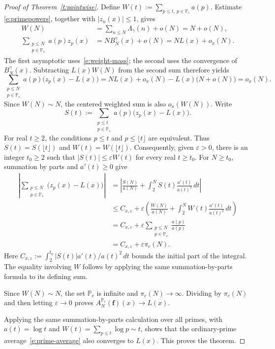 \documentclass[12pt]{amsart}
\newcommand{\1}{\mathbf 1}
\begin{document}
\begin{proof}[Proof of Theorem~\ref{t:pointwise}]
Define $W(t):=\sum_{p\leq t,\ p\in\mathbb P_c}a(p)$.
Estimate \eqref{e:primepowers}, together with $|z_n(x)|\leq1$,
gives
\begin{align*}
 W(N)
 &=\sum_{n\leq N}\Lambda_\gamma(n)+o(N)
 =N+o(N),\\
 \sum_{\substack{p\leq N\\p\in\mathbb P_c}}a(p)z_p(x)
 &=N B_N^\gamma(x)+o(N)
 =N L(x)+o_x(N).
\end{align*}
The first asymptotic uses~\eqref{e:weight-mass}; the second uses
the convergence of $B_N^\gamma(x)$. Subtracting $L(x)W(N)$
from the second sum therefore yields
\[
 \sum_{\substack{p\leq N\\p\in\mathbb P_c}}
 a(p)\bigl(z_p(x)-L(x)\bigr)
 =N L(x)+o_x(N)-L(x)\bigl(N+o(N)\bigr)
 =o_x(N).
\]
Since $W(N)\sim N$, the centered weighted sum is also
$o_x(W(N))$. Write
\[
 S(t):=\sum_{\substack{p\leq t\\p\in\mathbb P_c}}
 a(p)\bigl(z_p(x)-L(x)\bigr).
\]
For real $t\geq2$, the conditions $p\leq t$ and
$p\leq\lfloor t\rfloor$ are equivalent. Thus
$S(t)=S(\lfloor t\rfloor)$ and $W(t)=W(\lfloor t\rfloor)$.
Consequently, given $\varepsilon>0$, there is an integer
$t_0\geq2$ such that $|S(t)|\leq\varepsilon W(t)$ for every
real $t\geq t_0$.
For $N\geq t_0$, summation by parts and $a'(t)\geq0$ give
\begin{align*}
 \left|\sum_{\substack{p\leq N\\p\in\mathbb P_c}}
 \bigl(z_p(x)-L(x)\bigr)\right|
 &=\left|
 \frac{S(N)}{a(N)}
 +\int_2^N S(t)\frac{a'(t)}{a(t)^2}\,dt
 \right|\\
 &\leq C_{x,\varepsilon}
 +\varepsilon\left(
 \frac{W(N)}{a(N)}
 +\int_2^N W(t)\frac{a'(t)}{a(t)^2}\,dt
 \right)\\
 &=C_{x,\varepsilon}
 +\varepsilon\sum_{\substack{p\leq N\\p\in\mathbb P_c}}
 \frac{a(p)}{a(p)}\\
 &=C_{x,\varepsilon}+\varepsilon\pi_c(N).
\end{align*}
Here
$C_{x,\varepsilon}:=\int_2^{t_0}|S(t)|a'(t)/a(t)^2\,dt$
bounds the initial part of the integral. The equality involving
$W$ follows by applying the same summation-by-parts formula
to its defining sum.

Since $W(N)\sim N$, the set $\mathbb P_c$ is infinite and
$\pi_c(N)\to\infty$. Dividing by $\pi_c(N)$ and then letting
$\varepsilon\to0$ proves
$A_N^{\mathbb P_c}(\mathbf f)(x)\to L(x)$.

Applying the same summation-by-parts calculation over all primes,
with $a(t)=\log t$ and
$W(t)=\sum_{p\leq t}\log p\sim t$, shows that
the ordinary-prime average~\eqref{e:prime-average} also converges
to $L(x)$. This proves the theorem.
\end{proof}
\end{document}
